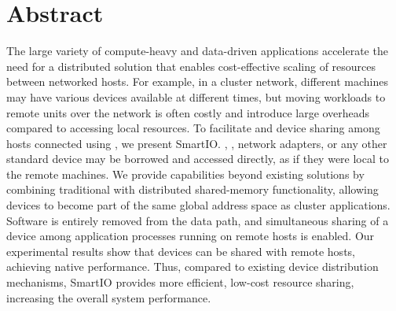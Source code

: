 \chapter{Abstract}

The large variety of compute-heavy and data-driven applications accelerate the need for a distributed  solution that enables cost-effective scaling of resources between networked hosts. 
%
For example, in a cluster network, different machines may have various devices available at different times, but moving workloads to remote units over the network is often costly and introduce large overheads compared to accessing local resources. 
%
To facilitate   and device sharing among hosts connected using  , we present SmartIO.
%
, , network adapters, or any other standard  device may be borrowed and accessed directly, as if they were local to the remote machines. %
%
We provide capabilities beyond existing  solutions by combining traditional  with distributed shared-memory functionality, allowing devices to become part of the same global address space as cluster applications. 
Software is entirely removed from the data path, and simultaneous sharing of a device among application processes running on remote hosts is enabled.
%
Our experimental results show that  devices can be shared with remote hosts, achieving native  performance.
%
Thus, compared to existing device distribution mechanisms, SmartIO provides more efficient, low-cost resource sharing, increasing the overall system performance.




